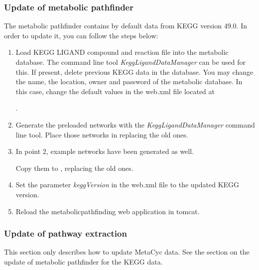 \documentclass{book}
\begin{document}
\subsubsection{Update of metabolic pathfinder}
The metabolic pathfinder contains by default data from KEGG version 49.0.
In order to update it, you can follow the steps below:

\begin{enumerate}

\item Load KEGG LIGAND compound and reaction file into the metabolic database.
      The command line tool \textit{KeggLigandDataManager} can be used for this.
      If present, delete previous KEGG data in the database. You may change the name,
      the location, owner and password of the metabolic database. In this case, change the
      default values in the web.xml file located at

      .

\item Generate the preloaded networks with the \textit{KeggLigandDataManager} command line tool.
      Place those networks in  replacing the old ones.

\item In point 2, example networks have been generated as well.

      Copy them to
      , replacing the old ones.

\item Set the parameter \textit{keggVersion} in the web.xml file to the updated KEGG version.

\item Reload the metabolicpathfinding web application in tomcat.

\end{enumerate}

\subsubsection{Update of pathway extraction}

This section only describes how to update MetaCyc data.
See the section on the update of metabolic pathfinder for the KEGG data.
\end{document}
